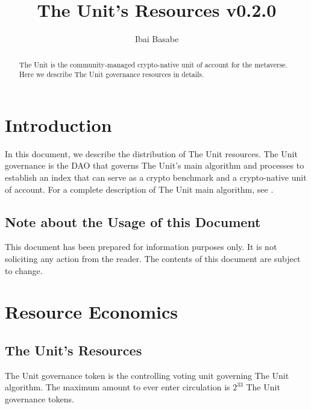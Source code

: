 \documentclass[12pt]{article}
\title{The Unit's Resources v0.2.0}
\author{Ibai Basabe}
\date{}           %
\begin{document}
\pagecolor{white}

\maketitle

\begin{abstract}

The Unit is the community-managed crypto-native unit of account for the metaverse. Here we describe The Unit governance resources in details.

\end{abstract}

\tableofcontents
\newpage



\section{Introduction}

In this document, we describe the distribution of The Unit resources. The Unit governance is the DAO that governs The Unit's main algorithm and processes to establish an index that can serve as a crypto benchmark and a crypto-native unit of account. For a complete description of The Unit main algorithm, see \cite{B1}.

\subsection{Note about the Usage of this Document}

This document has been prepared for information purposes only. It is not soliciting any action from the reader. The contents of this document are subject to change.


\section{Resource Economics}

\subsection{The Unit's Resources}

The Unit governance token is the controlling voting unit governing The Unit algorithm. The maximum amount to ever enter circulation is $2^{33}$ The Unit governance tokens.





\newpage
\end{document}
